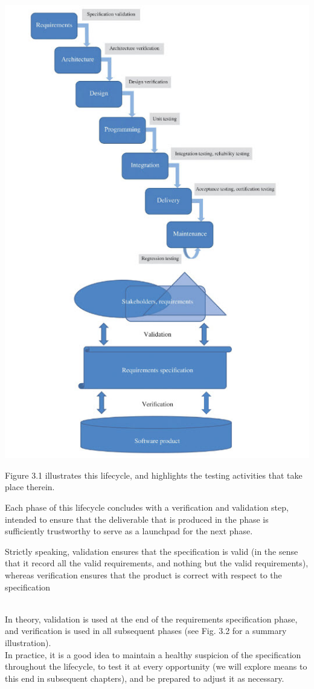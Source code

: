 \includegraphics[]{figure31.jpg}

Figure 3.1 illustrates this lifecycle, and highlights the testing activities that take place therein. 

Each phase of this lifecycle concludes with a verification and validation step, intended to ensure that the deliverable that is produced in the phase is sufficiently trustworthy to serve as a launchpad for the next phase. 

Strictly speaking, validation ensures that the specification is valid (in the sense that it record all the valid requirements, and nothing but the valid requirements), whereas verification ensures that the product is correct with respect to the specification

\\
In theory, validation is used at the end of the requirements specification phase, and verification is used in all subsequent phases (see Fig. 3.2 for a summary illustration). 
\\
In practice, it is a good idea to maintain a healthy suspicion of the specification throughout the lifecycle, to test it at every opportunity (we will explore means to this end in subsequent chapters), and be prepared to adjust it as necessary.






